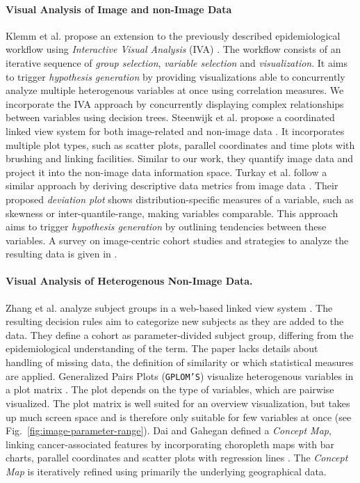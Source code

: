 \documentclass[a4paper,twoside]{style/article}
\begin{document}
\paragraph{Visual Analysis of Image and non-Image Data}
Klemm et al. propose an extension to the previously described epidemiological workflow using \emph{Interactive Visual Analysis} (IVA) \cite{Klemm2014VIS}.
The workflow consists of an iterative sequence of \emph{group selection}, \emph{variable selection} and \emph{visualization}.
It aims to trigger \emph{hypothesis generation} by providing visualizations able to concurrently analyze multiple heterogenous variables at once using correlation measures.
We incorporate the IVA approach by concurrently displaying complex relationships between variables using decision trees.
Steenwijk et al. propose a coordinated linked view system for both image-related and non-image data \cite{Steenwijk}.
It incorporates multiple plot types, such as scatter plots, parallel coordinates and time plots with brushing and linking facilities.
Similar to our work, they quantify image data and project it into the non-image data information space.
Turkay et al. follow a similar approach by deriving descriptive data metrics from image data \cite{Turkay}.
Their proposed \emph{deviation plot} shows distribution-specific measures of a variable, such as skewness or inter-quantile-range, making variables comparable.
This approach aims to trigger \emph{hypothesis generation} by outlining tendencies between these variables.
A survey on image-centric cohort studies and strategies to analyze the resulting data is given in \cite{Preim2014}.
\paragraph{Visual Analysis of Heterogenous Non-Image Data.}
Zhang et al. analyze subject groups in a web-based linked view system \cite{Zhang}.
The resulting decision rules aim to categorize new subjects as they are added to the data.
They define a cohort as parameter-divided subject group, differing from the epidemiological understanding of the term.
The paper lacks details about handling of missing data, the definition of similarity or which statistical measures are applied.
Generalized Pairs Plots (\texttt{GPLOM'S}) visualize heterogenous variables in a plot matrix \cite{GPLOMS,Francois}.
The plot depends on the type of variables, which are pairwise visualized.
The plot matrix is well suited for an overview visualization, but takes up much screen space and is therefore only suitable for few variables at once (see Fig.~\ref{fig:image-parameter-range}).
Dai and Gahegan defined a \emph{Concept Map}, linking cancer-associated features by incorporating choropleth maps with bar charts, parallel coordinates and scatter plots with regression lines \cite{Dai}.
The \emph{Concept Map} is iteratively refined using primarily the underlying geographical data.
\end{document}
